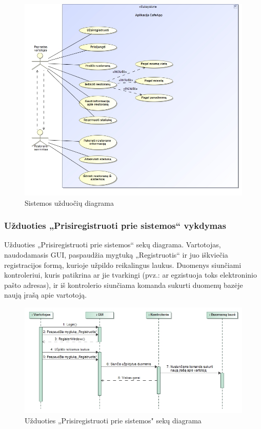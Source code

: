 \documentclass{VUMIFPSkursinis}
\begin{document}
{{{{{%
\begin{figure}[H]
	\centering
	\includegraphics[width=\textwidth,height=\textheight,keepaspectratio]{img/SystemTasks}
	\caption{Sistemos užduočių diagrama}
	\label{img:SystemTasks}
\end{figure}

\subsubsection{Užduoties „Prisiregistruoti prie sistemos“ vykdymas}
Užduoties „Prisiregistruoti prie sistemos“ sekų diagrama. Vartotojas, naudodamasis GUI, paspaudžia mygtuką „Registruotis“ ir juo iškviečia registracijos formą, kurioje užpildo reikalingus laukus. Duomenys siunčiami kontroleriui, kuris patikrina ar jie tvarkingi (pvz.: ar egzistuoja toks elektroninio pašto adresas), ir iš kontrolerio siunčiama komanda sukurti duomenų bazėje naują įrašą apie vartotoją.

\begin{figure}[H]
	\centering
	\includegraphics[width=\textwidth,height=\textheight,keepaspectratio]{img/Register}
	\caption{Užduoties „Prisiregistruoti prie sistemos" sekų diagrama}
	\label{img:RegisterTask}
\end{figure}

}}}}}
\end{document}
